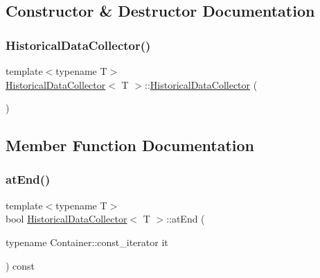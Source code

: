 \subsection{Constructor \& Destructor Documentation}
\mbox{\label{class_historical_data_collector_a195386607b9d0cd494db9a44bcc74ff6}} 
\subsubsection{\texorpdfstring{HistoricalDataCollector()}{HistoricalDataCollector()}}
{\footnotesize\ttfamily template$<$typename T$>$ \\
\mbox{\hyperlink{class_historical_data_collector}{Historical\+Data\+Collector}}$<$ T $>$\+::\mbox{\hyperlink{class_historical_data_collector}{Historical\+Data\+Collector}} (\begin{DoxyParamCaption}{ }\end{DoxyParamCaption})\hspace{0.3cm}{\ttfamily [inline]}}



\subsection{Member Function Documentation}
\mbox{\label{class_historical_data_collector_afe29d009cdbb84ed48546bed52989d87}} 
\subsubsection{\texorpdfstring{atEnd()}{atEnd()}}
{\footnotesize\ttfamily template$<$typename T$>$ \\
bool \mbox{\hyperlink{class_historical_data_collector}{Historical\+Data\+Collector}}$<$ T $>$\+::at\+End (\begin{DoxyParamCaption}\item[{typename Container\+::const\+\_\+iterator}]{it }\end{DoxyParamCaption}) const\hspace{0.3cm}{\ttfamily [inline]}}

